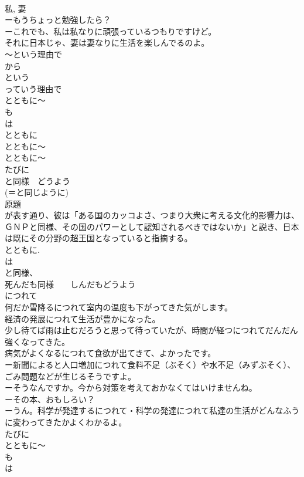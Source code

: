 \documentclass[8pt]{extreport}
\begin{document}
\begin{CJK}{UTF8}{min}
\\	私, 妻
\\	ーもうちょっと勉強したら？
\\	ーこれでも、私は私なりに頑張っているつもりですけど。
\\	それに日本じゃ、妻は妻なりに生活を楽しんでるのよ。	
\\	～という理由で
\\	から 
\\	という 
\\	っていう理由で
\\	とともに～
\\	も 
\\	は
\\	とともに
\\	とともに～
\\	とともに～
\\	たびに
\\	と同様　どうよう
\\	(＝と同じように)
\\	原題
\\	が表す通り、彼は「ある国のカッコよさ、つまり大衆に考える文化的影響力は、ＧＮＰと同様、その国のパワーとして認知されるべきではないか」と説き、日本は既にその分野の超王国となっていると指摘する。
\\	とともに.
\\	は
\\	と同様、
\\	死んだも同様　　しんだもどうよう
\\	につれて
\\	何だか雪降るにつれて室内の温度も下がってきた気がします。
\\	経済の発展につれて生活が豊かになった。
\\	少し待てば雨は止むだろうと思って待っていたが、時間が経つにつれてだんだん強くなってきた。
\\	病気がよくなるにつれて食欲が出てきて、よかったです。
\\	ー新聞によると人口増加につれて食料不足（ぶそく）や水不足（みずぶそく）、ごみ問題などが生じるそうですよ。
\\	ーそうなんですか。今から対策を考えておかなくてはいけませんね。
\\	ーその本、おもしろい？
\\	ーうん。科学が発達するにつれて・科学の発達につれて私達の生活がどんなふうに変わってきたかよくわかるよ。	
\\	たびに
\\	とともに～
\\	も 
\\	は

\end{CJK}
\end{document}
